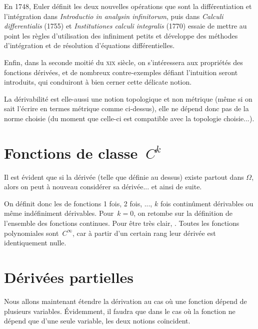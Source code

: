 \begin{histoire}
\medskip
En 1748, Euler définit les deux nouvelles opérations que sont la différentiation et l'intégration dans \emph{Introductio in analysin infinitorum}, puis dans \emph{Calculi differentialis} (1755) et \emph{Institutiones calculi integralis} (1770) essaie de mettre au point les règles d'utilisation des infiniment petits et développe des méthodes d'intégration et de résolution d'équations différentielles.

\medskip
Enfin, dans la seconde moitié du \textsc{xix} siècle, on s'intéressera aux propriétés des fonctions dérivées, et de nombreux contre-exemples défiant l'intuition seront introduits, qui conduiront à bien cerner cette délicate notion.
\end{histoire}

\medskip
La dérivabilité est elle-aussi une notion topologique et non métrique (même si on sait l'écrire en termes métrique comme ci-dessus), elle ne dépend donc pas de la norme choisie (du moment que celle-ci est compatible avec la topologie choisie...).


\medskip
\section{Fonctions de classe~$C^k$}
\medskipvm
Il est évident que si la dérivée (telle que définie au dessus) existe partout dans $\Omega$, alors on peut à nouveau considérer sa dérivée... et ainsi de suite.

On définit donc les  de fonctions 1 fois, 2 fois, ..., $k$ fois continûment dérivables ou même indéfiniment dérivables.
\medskipvm
Pour~$k=0$, on retombe sur la définition de l'ensemble des fonctions continues.
\medskipvm
Pour être très clair, .
\medskipvm
Toutes les fonctions polynomiales sont~$C^\infty$, car à partir d'un certain rang leur dérivée est identiquement nulle.

\medskip
\section{Dérivées partielles}
Nous allons maintenant étendre la dérivation au cas où une fonction dépend de plusieurs variables. Évidemment, il faudra que dans le cas où la fonction ne dépend que d'une seule variable, les deux notions coïncident.


